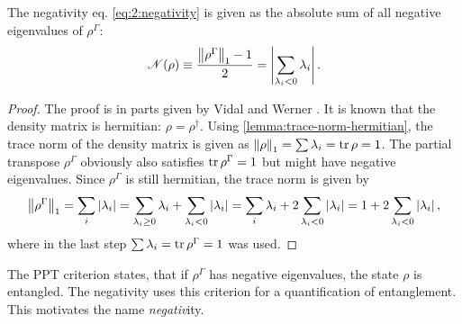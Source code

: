 \begin{proposition}\label{proposition:negativity}
  The negativity eq. \eqref{eq:2:negativity} is given as the absolute sum of all negative eigenvalues of $\rho^{\Gamma}$: 
\begin{equation}
    \mathscr{N}(\rho) \equiv \frac{\left\lVert\rho^{\Gamma}\right\rVert_1 - 1}{2} = \left\lvert\sum_{\lambda_i < 0} \lambda_i\right\rvert.
\end{equation}
\end{proposition}
\begin{proof}
  The proof is in parts given by Vidal and Werner \cite{Vidal_2001}. It is known that the density matrix is hermitian: $\rho = \rho^\dagger$. Using \cref{lemma:trace-norm-hermitian}, the trace norm of the density matrix is given as $\left\lVert\rho\right\rVert_1=\sum \lambda_i = \tr \rho = 1$. The partial transpose $\rho^{\Gamma}$ obviously also satisfies $\tr \rho^{\Gamma} = 1$ but might have negative eigenvalues. Since $\rho^{\Gamma}$ is still hermitian, the trace norm is given by
  \begin{equation*}
    \left\lVert\rho^{\Gamma}\right\rVert_1 = \sum_i\left\lvert\lambda_i\right\rvert = \sum_{\lambda_i \ge 0} \lambda_i + \sum_{\lambda_i < 0} \left\lvert\lambda_i\right\rvert = \sum_i \lambda_i + 2\sum_{\lambda_i < 0} \left\lvert\lambda_i\right\rvert = 1 + 2\sum_{\lambda_i < 0} \left\lvert\lambda_i\right\rvert ,
  \end{equation*}
  where in the last step $\sum \lambda_i = \tr \rho^{\Gamma} = 1$ was used.
\end{proof}
\begin{remark}
  The PPT criterion states, that if $\rho^{\Gamma}$ has negative eigenvalues, the state $\rho$ is entangled. The negativity uses this criterion for a quantification of entanglement. This motivates the name \textit{negativ}ity.
\end{remark}

